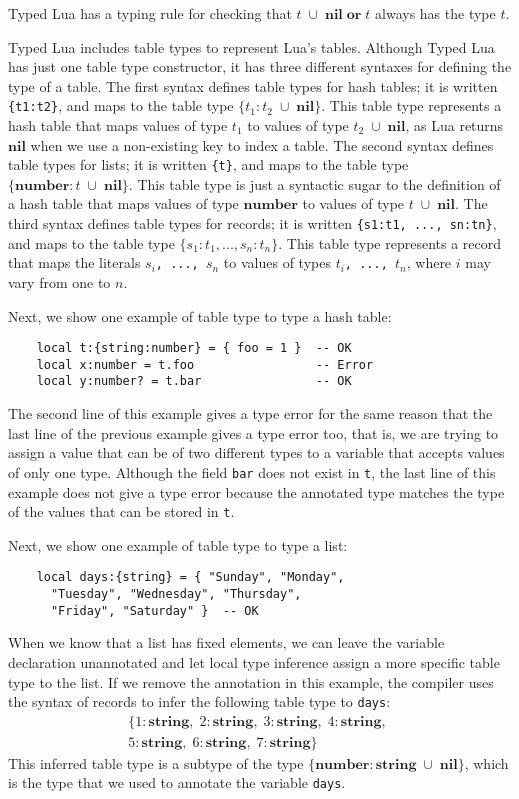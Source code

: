\documentclass[preprint]{sig-alternate}
\newcommand{\Nil}{\mathbf{nil}}
\newcommand{\Number}{\mathbf{number}}
\newcommand{\String}{\mathbf{string}}
\begin{document}
Typed Lua has a typing rule for checking that
$t\;\cup\;\Nil\;\mathbf{or}\;t$ always has the type $t$.

Typed Lua includes table types to represent Lua's tables.
Although Typed Lua has just one table type constructor, it has three
different syntaxes for defining the type of a table.
The first syntax defines table types for hash tables;
it is written \texttt{\{t1:t2\}},
and maps to the table type $\{t_{1}:t_{2}\;\cup\;\Nil\}$.
This table type represents a hash table that maps values of type
$t_{1}$ to values of type $t_{2}\;\cup\;\Nil$, as Lua returns
$\Nil$ when we use a non-existing key to index a table.
The second syntax defines table types for lists;
it is written \texttt{\{t\}},
and maps to the table type $\{\Number:t\;\cup\;\Nil\}$.
This table type is just a syntactic sugar to the definition of a
hash table that maps values of type $\Number$ to values of type
$t\;\cup\;\Nil$.
The third syntax defines table types for records;
it is written \texttt{\{s1:t1, ..., sn:tn\}},
and maps to the table type $\{s_{1}:t_{1}, ..., s_{n}:t_{n}\}$.
This table type represents a record that maps the literals
$s_{i}$\texttt{, ..., }$s_{n}$ to values of types
$t_{i}$\texttt{, ..., }$t_{n}$, where $i$ may vary from one to $n$.

Next, we show one example of table type to type a hash table:
\begin{verbatim}
    local t:{string:number} = { foo = 1 }  -- OK
    local x:number = t.foo                 -- Error
    local y:number? = t.bar                -- OK
\end{verbatim}

The second line of this example gives a type error for the same
reason that the last line of the previous example gives a type error
too, that is, we are trying to assign a value that can be of two
different types to a variable that accepts values of only one type.
Although the field \texttt{bar} does not exist in \texttt{t}, the last
line of this example does not give a type error because the
annotated type matches the type of the values that can be stored in
\texttt{t}.

Next, we show one example of table type to type a list:
\begin{verbatim}
    local days:{string} = { "Sunday", "Monday",
      "Tuesday", "Wednesday", "Thursday",
      "Friday", "Saturday" }  -- OK
\end{verbatim}

When we know that a list has fixed elements, we can leave the
variable declaration unannotated and let local type inference assign
a more specific table type to the list.
If we remove the annotation in this example, the compiler uses the
syntax of records to infer the following table type to \texttt{days}:
\begin{align*}
\{{1:\String},\;{2:\String},\;{3:\String},\;{4:\String},\;\\
{5:\String},\;{6:\String},\;{7:\String}\}
\end{align*}
This inferred table type is a subtype of the type
$\{\Number:\String\;\cup\;\Nil\}$, which is the type that we used to
annotate the variable \texttt{days}.
\end{document}
